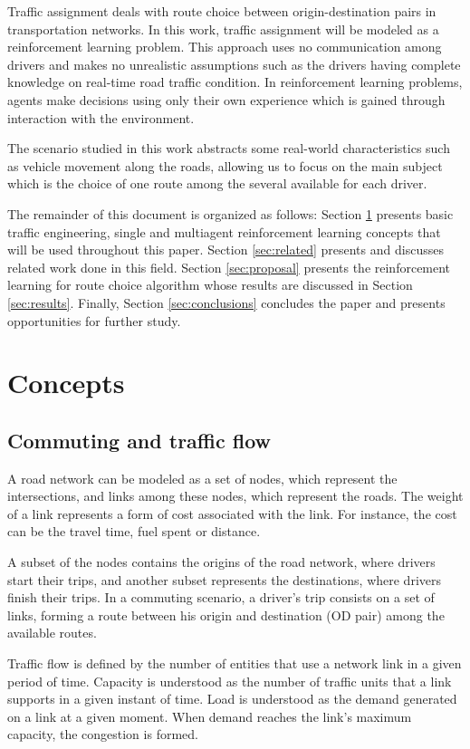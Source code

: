 \documentclass[12pt]{llncs}
\begin{document}
Traffic assignment deals with route choice between origin-destination pairs in transportation networks. In this work, traffic assignment will be modeled as a reinforcement learning problem. This approach uses no communication among drivers and makes no unrealistic assumptions such as the drivers having complete knowledge on real-time road traffic condition. In reinforcement learning problems, agents make decisions using only their own experience which is gained through interaction with the environment.

The scenario studied in this work abstracts some real-world characteristics such as vehicle movement along the roads, allowing us to focus on the main subject which is the choice of one route among the several available for each driver.

The remainder of this document is organized as follows: Section \ref{sec:concepts} presents basic traffic engineering, single and multiagent reinforcement learning concepts that will be used throughout this paper. Section \ref{sec:related} presents and discusses related work done in this field. Section \ref{sec:proposal} presents the reinforcement learning for route choice algorithm whose results are discussed in Section \ref{sec:results}. Finally, Section \ref{sec:conclusions} concludes the paper and presents opportunities for further study.

\section{Concepts}
\label{sec:concepts}
\subsection{Commuting and traffic flow}

A road network can be modeled as a set of nodes, which represent the intersections, and links among these nodes, which represent the roads. The weight of a link represents a form of cost associated with the link. For instance, the cost can be the travel time, fuel spent or distance.

A subset of the nodes contains the origins of the road network, where drivers start their trips, and another subset represents the destinations, where drivers finish their trips. In a commuting scenario, a driver's trip consists on a set of links, forming a route between his origin and destination (OD pair) among the available routes.

Traffic flow is defined by the number of entities that use a network link in a given period of time. Capacity is understood as the number of traffic units that a link supports in a given instant of time. Load is understood as the demand generated on a link at a given moment. When demand reaches the link's maximum capacity, the congestion is formed.
\end{document}

